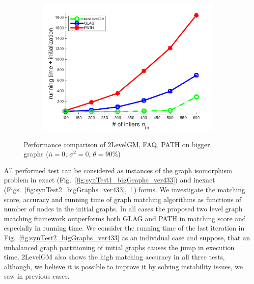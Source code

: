 \begin{figure}[h]
\begin{subfigure}[b]{0.3\textwidth}
			\includegraphics[scale=0.25]{"chapter3/fig/SyntheticTest_BigGraphs/descr/Results_v4.3.3/Test3/time_summary_avg1t"} 
		\end{subfigure} 	
	\caption[Performance comparison of 2LevelGM, FAQ, PATH on bigger graphs: test $3$]{Performance comparison of 2LevelGM, FAQ, PATH on bigger graphs ($\bar{n}=0$, $\sigma^2=0$, $\theta=90\%$)}
	\label{fig:synTest3_bigGraphs_ver433}
\end{figure}

All performed test can be considered as instances of the graph isomorphism problem in exact (Fig.~\ref{fig:synTest1_bigGraphs_ver433}) and inexact (Figs.~\ref{fig:synTest2_bigGraphs_ver433},~\ref{fig:synTest3_bigGraphs_ver433}) forms. We investigate the matching score, accuracy and running time of graph matching algorithms as functions of number of nodes in the initial graphs.
In all cases the proposed two level graph matching framework outperforms both GLAG and PATH in matching score and especially in running time. We consider the running time of the last iteration in Fig.~\ref{fig:synTest2_bigGraphs_ver433} as an individual case and suppose, that an imbalanced graph partitioning of initial graphs causes the jump in execution time. 2LevelGM also shows the high matching accuracy in all three tests, although, we believe it is possible to improve it by solving instability issues, we saw in previous cases. 
\FloatBarrier


